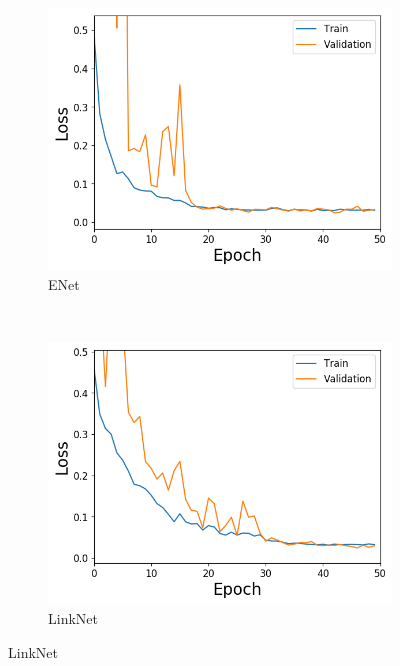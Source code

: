 \documentclass{kththesis}
\begin{document}
\begin{figure}[h]
    \centering
    \begin{subfigure}[b]{0.45\textwidth}
        \includegraphics[width=\textwidth]{train_ENet_CrossEntropy}
        \caption{ENet}
        \label{fig:train_ENet}
    \end{subfigure}
    ~ %
    \begin{subfigure}[b]{0.45\textwidth}
        \includegraphics[width=\textwidth]{train_LinkNet_IoU}
        \caption{LinkNet}
        \label{fig:train_LinkNet}
      \end{subfigure}
      

\end{figure}
\end{document}
